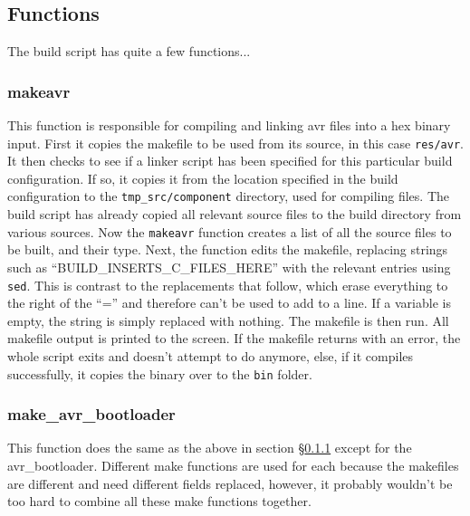 \documentclass[a4paper, oneside, 11pt, titlepage, onecolumn, openright]{report}
\begin{document}
\subsection{Functions}
			\label{ss:buildFunctions}
			The build script has quite a few functions...
			
\subsubsection{makeavr}
			\label{sss:buildMakeavr}
			This function is responsible for compiling and linking avr files into a hex binary input.\newline
			First it copies the makefile to be used from its source, in this case \texttt{res/avr}.\newline
			It then checks to see if a linker script has been specified for this particular build configuration. If so, it copies it from the location specified in the build configuration to the \texttt{tmp\_src/component} directory, used for compiling files.\newline \newline
			The build script has already copied all relevant source files to the build directory from various sources. Now the \texttt{makeavr} function creates a list of all the source files to be built, and their type.\newline
			Next, the function edits the makefile, replacing strings such as ``BUILD\_INSERTS\_C\_FILES\_HERE'' with the relevant entries using \texttt{sed}. This is contrast to the replacements that follow, which erase everything to the right of the ``='' and therefore can't be used to add to a line. If a variable is empty, the string is simply replaced with nothing.\newline \newline
			The makefile is then run. All makefile output is printed to the screen. If the makefile returns with an error, the whole script exits and doesn't attempt to do anymore, else, if it compiles successfully, it copies the binary over to the \texttt{bin} folder.
			
\subsubsection{make\_avr\_bootloader}
			\label{sss:buildMakeavrbootloader}
			This function does the same as the above in section \S\ref{sss:buildMakeavr} except for the avr\_bootloader. Different make functions are used for each because the makefiles are different and need different fields replaced, however, it probably wouldn't be too hard to combine all these make functions together.
			
\end{document}
